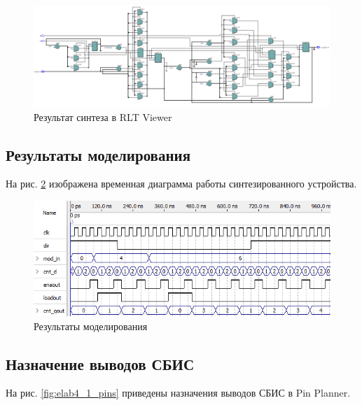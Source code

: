 \begin{figure}[H]
\begin{center}
	\includegraphics[width=\textwidth]{elab4_1_rtl}
	\caption{Результат синтеза в RLT Viewer}
	\label{fig:elab4_1_rtl}
\end{center}
\end{figure}

\subsection{Результаты моделирования}
\label{sec:elab4_1_modeling}

На рис. \ref{fig:elab4_1_modeling} изображена временная диаграмма работы синтезированного устройства. 

\begin{figure}[H]
\begin{center}
	\includegraphics[width=\textwidth]{elab4_1_modeling}
	\caption{Результаты моделирования}
	\label{fig:elab4_1_modeling}
\end{center}
\end{figure}

\subsection{Назначение выводов СБИС}

На рис. \ref{fig:elab4_1_pins} приведены назначения выводов СБИС в Pin Planner.

